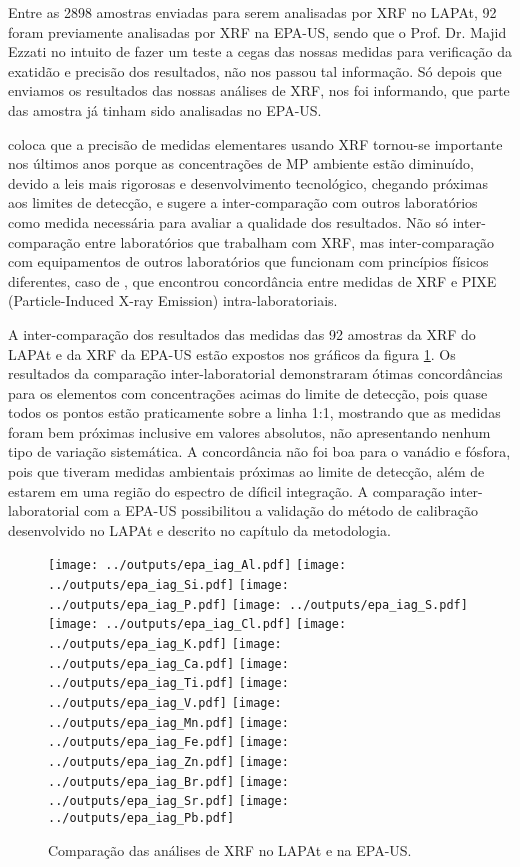 Entre as 2898 amostras enviadas para serem analisadas por XRF no LAPAt, 92 foram 
previamente analisadas por XRF na EPA-US, sendo que o Prof. Dr. Majid Ezzati
no intuito de fazer um teste a cegas das nossas medidas para verificação da 
exatidão e precisão dos resultados, não nos passou tal informação. Só depois que
enviamos os resultados das nossas análises de XRF, 
nos foi informando, que parte das amostra já tinham sido analisadas no EPA-US. 

\citet{kang2014} coloca que a precisão de medidas elementares usando XRF 
tornou-se importante nos últimos anos porque as concentrações de MP ambiente 
estão diminuído, devido a leis mais rigorosas e desenvolvimento tecnológico, 
chegando próximas aos limites de detecção, e sugere a inter-comparação com 
outros laboratórios como medida necessária para avaliar a qualidade dos 
resultados. Não só inter-comparação entre laboratórios que trabalham com XRF, 
mas inter-comparação com equipamentos de outros laboratórios que funcionam com
princípios físicos diferentes, caso de \citet{nejedly1998}, que encontrou 
concordância entre medidas de XRF e PIXE (Particle-Induced X-ray Emission) 
intra-laboratoriais.

A inter-comparação dos resultados das medidas das 92 amostras da XRF do
LAPAt e da XRF da EPA-US estão expostos nos gráficos da figura 
\ref{fig:epa_lapat}. Os resultados da comparação inter-laboratorial demonstraram
ótimas concordâncias para os 
elementos com concentrações acimas do limite de detecção, pois quase todos
os pontos estão praticamente sobre a linha 1:1, mostrando que as
medidas foram bem próximas inclusive em valores absolutos, não apresentando
nenhum tipo de variação sistemática. A concordância não foi boa para o vanádio 
e fósfora, pois que tiveram medidas ambientais próximas ao limite de detecção, 
além de estarem em uma região do espectro de díficil integração. 
A comparação inter-laboratorial com a EPA-US possibilitou a 
validação do método de calibração desenvolvido no LAPAt e descrito no capítulo
da metodologia.

\newpage
\begin{figure}[H]
  \centering
    \texttt{[image: ../outputs/epa\_iag\_Al.pdf]}
    \texttt{[image: ../outputs/epa\_iag\_Si.pdf]}
    \texttt{[image: ../outputs/epa\_iag\_P.pdf]}
    \texttt{[image: ../outputs/epa\_iag\_S.pdf]}
    \texttt{[image: ../outputs/epa\_iag\_Cl.pdf]}
    \texttt{[image: ../outputs/epa\_iag\_K.pdf]}
    \texttt{[image: ../outputs/epa\_iag\_Ca.pdf]}
    \texttt{[image: ../outputs/epa\_iag\_Ti.pdf]}
    \texttt{[image: ../outputs/epa\_iag\_V.pdf]}
    \texttt{[image: ../outputs/epa\_iag\_Mn.pdf]}
    \texttt{[image: ../outputs/epa\_iag\_Fe.pdf]}
    \texttt{[image: ../outputs/epa\_iag\_Zn.pdf]}
    \texttt{[image: ../outputs/epa\_iag\_Br.pdf]}
    \texttt{[image: ../outputs/epa\_iag\_Sr.pdf]}
    \texttt{[image: ../outputs/epa\_iag\_Pb.pdf]}
  \caption{Comparação das análises de XRF no LAPAt e na EPA-US. \label{fig:epa_lapat}}
\end{figure}
